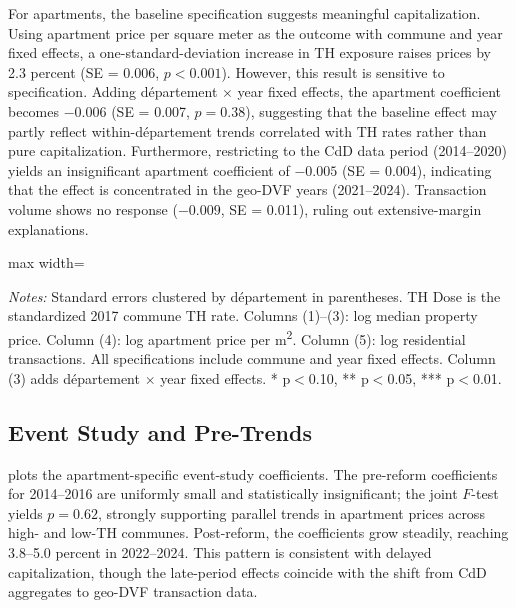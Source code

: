 \documentclass[12pt]{article}
\begin{document}
For apartments, the baseline specification suggests meaningful capitalization. Using apartment price per square meter as the outcome with commune and year fixed effects, a one-standard-deviation increase in TH exposure raises prices by 2.3 percent (SE = 0.006, $p < 0.001$). However, this result is sensitive to specification. Adding d\'{e}partement $\times$ year fixed effects, the apartment coefficient becomes $-0.006$ (SE = 0.007, $p = 0.38$), suggesting that the baseline effect may partly reflect within-d\'{e}partement trends correlated with TH rates rather than pure capitalization. Furthermore, restricting to the CdD data period (2014--2020) yields an insignificant apartment coefficient of $-0.005$ (SE = 0.004), indicating that the effect is concentrated in the geo-DVF years (2021--2024). Transaction volume shows no response ($-0.009$, SE = 0.011), ruling out extensive-margin explanations.

\begin{table}[H]
\centering
\caption{Main Results: Effect of TH Dose on Property Prices}
\label{tab:main_results}
\begin{adjustbox}{max width=\textwidth}

\end{adjustbox}
\begin{tablenotes}[flushleft]
\small
\item \emph{Notes:} Standard errors clustered by d\'{e}partement in parentheses. TH Dose is the standardized 2017 commune TH rate. Columns (1)--(3): log median property price. Column (4): log apartment price per m\textsuperscript{2}. Column (5): log residential transactions. All specifications include commune and year fixed effects. Column (3) adds d\'{e}partement $\times$ year fixed effects. * p$<$0.10, ** p$<$0.05, *** p$<$0.01.
\end{tablenotes}
\end{table}


\subsection{Event Study and Pre-Trends}

 plots the apartment-specific event-study coefficients. The pre-reform coefficients for 2014--2016 are uniformly small and statistically insignificant; the joint $F$-test yields $p = 0.62$, strongly supporting parallel trends in apartment prices across high- and low-TH communes. Post-reform, the coefficients grow steadily, reaching 3.8--5.0 percent in 2022--2024. This pattern is consistent with delayed capitalization, though the late-period effects coincide with the shift from CdD aggregates to geo-DVF transaction data.
\end{document}
